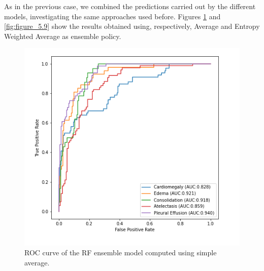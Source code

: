 \noindent As in the previous case, we combined the predictions carried out by the different models, investigating the same approaches used before. Figures \ref{fig:figure_5.8} and \ref{fig:figure_5.9} show the results obtained using, respectively, Average and Entropy Weighted Average as ensemble policy. 

\begin{figure}[htbp!]
    \centering
    \includegraphics[scale=0.55]{Tesi/images/Results/rf_average.png}
    \caption[ROC curve for RF simple average ensemble]{ROC curve of the RF ensemble model computed using simple average.}
    \label{fig:figure_5.8}
\end{figure}

